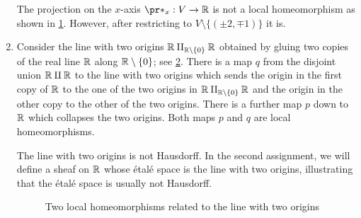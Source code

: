 \documentclass[../main.tex]{subfiles}
\begin{document}
\begin{exmp}
\begin{enumerate}
\begin{figure}
    \label{fig:zerolocuslocalhomeo}
\end{figure}
        The projection on the $x$-axis $\pr*_x\colon V \to \mathbb{R}$ is not a local homeomorphism as shown in \cref{fig:zerolocuslocalhomeo}.
        However, after restricting to $V\setminus \{(\pm 2, \mp 1)\}$ it is.
        \item
          Consider the line with two origins \(\bb R\pushout{\bb R\setminus\{0\}}\bb R\) obtained by gluing two copies of the real line \(\mathbb{R}\) along \(\mathbb{R}\setminus\{0\}\); see \cref{fig:local-homeomorphisms-line-two-origins}.
          There is a map \(q\) from the disjoint union \(\mathbb{R}\amalg\mathbb{R}\) to the line with two origins which sends the origin in the first copy of \(\mathbb{R}\) to the one of the two origins in \(\bb R\pushout{\bb R\setminus\{0\}}\bb R\) and the origin in the other copy to the other of the two origins.
          There is a further map \(p\) down to \(\mathbb{R}\) which collapses the two origins.
          Both maps \(p\) and \(q\) are local homeomorphisms.

          The line with two origins is not Hausdorff.
          In the second assignment, we will define a sheaf on \(\mathbb{R}\) whose étalé space is the line with two origins, illustrating that the étalé space is usually not Hausdorff.
          \begin{figure}
            \centering
            \caption{Two local homeomorphisms related to the line with two origins}
            \label{fig:local-homeomorphisms-line-two-origins}
          \end{figure}
    \end{enumerate}
\end{exmp}
\end{document}
